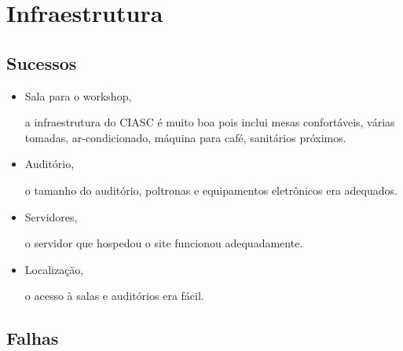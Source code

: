 \documentclass[12pt]{article}
\begin{document}
\section*{Infraestrutura}

\subsection*{Sucessos}

\begin{itemize}
  \item Sala para o workshop,

    a infraestrutura do CIASC é muito boa pois inclui mesas confortáveis, várias
    tomadas, ar-condicionado, máquina para café, sanitários próximos.

  \item Auditório,

    o tamanho do auditório, poltronas e equipamentos eletrônicos era adequados.

  \item Servidores,

    o servidor que hospedou o site funcionou adequadamente.

  \item Localização,

    o acesso à salas e auditórios era fácil.
\end{itemize}

\subsection*{Falhas}
\end{document}
